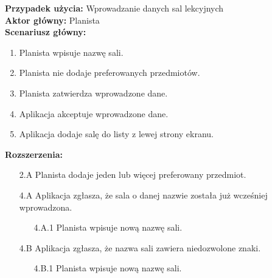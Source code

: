 \noindent
\textbf{Przypadek użycia:} Wprowadzanie danych sal lekcyjnych\\
\textbf{Aktor główny:} Planista\\
\textbf{Scenariusz główny:}
\begin{enumerate}
	\item Planista wpisuje nazwę sali.
	\item Planista nie dodaje preferowanych przedmiotów.
	\item Planista zatwierdza wprowadzone dane.
	\item Aplikacja akceptuje wprowadzone dane.
	\item Aplikacja dodaje salę do listy z lewej strony ekranu.
\end{enumerate}
\textbf{Rozszerzenia:}
	\begin{enumerate}
         \item[2.A] Planista dodaje jeden lub więcej preferowany przedmiot.
         \item[4.A] Aplikacja zgłasza, że sala o danej nazwie została już wcześniej wprowadzona.
         \begin{enumerate}
         	\item[4.A.1] Planista wpisuje nową nazwę sali.
         \end{enumerate}
         \item[4.B] Aplikacja zgłasza, że nazwa sali zawiera niedozwolone znaki.
         \begin{enumerate}
         	\item[4.B.1] Planista wpisuje nową nazwę sali.
         \end{enumerate}
	\end{enumerate}
	

